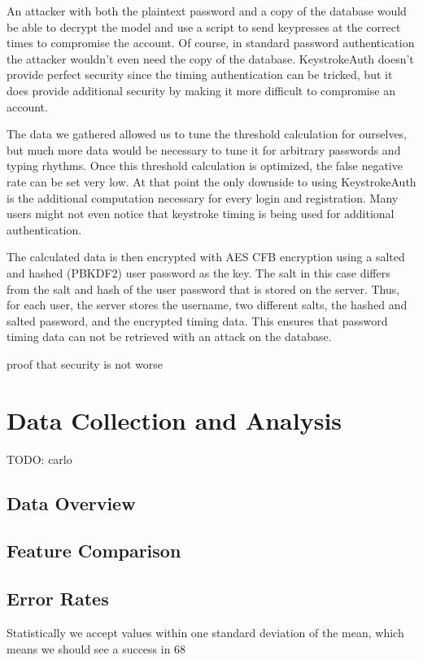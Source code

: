\documentclass{article}
\begin{document}
An attacker with both the plaintext password and a copy of the database would be able to decrypt the model and use a script to send keypresses at the correct times to compromise the account. 
Of course, in standard password authentication the attacker wouldn't even need the copy of the database.
KeystrokeAuth doesn't provide perfect security since the timing authentication can be tricked, but it does provide additional security by making it more difficult to compromise an account.

The data we gathered allowed us to tune the threshold calculation for ourselves, but much more data would be necessary to tune it for arbitrary passwords and typing rhythms. Once this threshold calculation is optimized, the false negative rate can be set very low. 
At that point the only downside to using KeystrokeAuth is the additional computation necessary for every login and registration.
Many users might not even notice that keystroke timing is being used for additional authentication.

The calculated data is then encrypted with AES CFB encryption using a salted and hashed (PBKDF2) user password as the key. The salt in this case differs from the salt and hash of the user password that is stored on the server. Thus, for each user, the server stores the username, two different salts, the hashed and salted password, and the encrypted timing data. This ensures that password timing data can not be retrieved with an attack on the database.


proof that security is not worse


\section{Data Collection and Analysis}
TODO: carlo

\subsection{Data Overview}

\subsection{Feature Comparison} %


\subsection{Error Rates}    %
Statistically we accept values within one standard deviation of the mean, which means we should see a success in 68%
\end{document}
